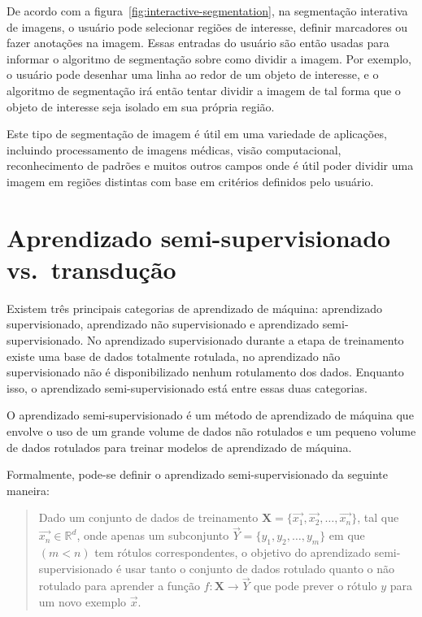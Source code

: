 De acordo com a figura~\ref{fig:interactive-segmentation}, na
segmentação interativa de imagens, o usuário pode selecionar regiões
de interesse, definir marcadores ou fazer anotações na imagem. Essas
entradas do usuário são então usadas para informar o algoritmo de
segmentação sobre como dividir a imagem. Por exemplo, o usuário pode
desenhar uma linha ao redor de um objeto de interesse, e o algoritmo
de segmentação irá então tentar dividir a imagem de tal forma que o
objeto de interesse seja isolado em sua própria região.

Este tipo de segmentação de imagem é útil em uma variedade de
aplicações, incluindo processamento de imagens médicas, visão
computacional, reconhecimento de padrões e muitos outros campos onde é
útil poder dividir uma imagem em regiões distintas com base em
critérios definidos pelo usuário.

\section{Aprendizado semi-supervisionado vs.\ transdução}\label{sec:teorica-aprendizado-semi-supervisionado}

Existem três principais categorias de aprendizado de máquina:
aprendizado supervisionado, aprendizado não supervisionado e
aprendizado semi-supervisionado. No aprendizado supervisionado durante
a etapa de treinamento existe uma base de dados totalmente rotulada,
no aprendizado não supervisionado não é disponibilizado nenhum
rotulamento dos dados. Enquanto isso, o aprendizado
semi-supervisionado está entre essas duas categorias.

O aprendizado semi-supervisionado é um método de aprendizado de máquina
que envolve o uso de um grande volume de dados não rotulados e um
pequeno volume de dados rotulados para treinar modelos de aprendizado
de máquina.

Formalmente, pode-se definir o aprendizado semi-supervisionado da seguinte maneira:

\begin{quote}
  Dado um conjunto de dados de treinamento
  $ \mathbf{X} = \{\vec{x_1}, \vec{x_2}, \ldots, \vec{x_n}\} $, tal que $ \vec{x_n} \in \mathbb{R}^d $,
  onde apenas um subconjunto  $ \vec{Y} = \{y_1, y_2, \ldots , y_m\} $ em que $ (m < n) $ tem rótulos
  correspondentes, o objetivo do aprendizado semi-supervisionado é usar
  tanto o conjunto de dados rotulado quanto o não rotulado para aprender
  a função $ f: \mathbf{X} \rightarrow \vec{Y} $ que pode prever o rótulo $ y $ para um novo
  exemplo $ \vec{x} $.
\end{quote}

